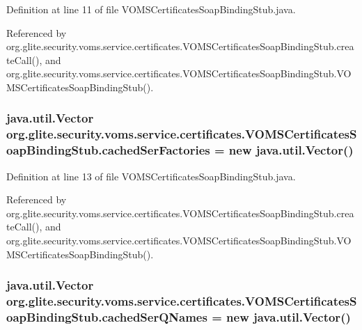 Definition at line 11 of file VOMSCertificatesSoapBindingStub.java.



Referenced by org.glite.security.voms.service.certificates.VOMSCertificatesSoapBindingStub.createCall(), and org.glite.security.voms.service.certificates.VOMSCertificatesSoapBindingStub.VOMSCertificatesSoapBindingStub().

\hypertarget{classorg_1_1glite_1_1security_1_1voms_1_1service_1_1certificates_1_1VOMSCertificatesSoapBindingStub_a66a5fa754279379d65f71345bce521a5}{
\subsubsection[{cachedSerFactories}]{\setlength{\rightskip}{0pt plus 5cm}java.util.Vector {\bf org.glite.security.voms.service.certificates.VOMSCertificatesSoapBindingStub.cachedSerFactories} = new java.util.Vector()}}
\label{classorg_1_1glite_1_1security_1_1voms_1_1service_1_1certificates_1_1VOMSCertificatesSoapBindingStub_a66a5fa754279379d65f71345bce521a5}


Definition at line 13 of file VOMSCertificatesSoapBindingStub.java.



Referenced by org.glite.security.voms.service.certificates.VOMSCertificatesSoapBindingStub.createCall(), and org.glite.security.voms.service.certificates.VOMSCertificatesSoapBindingStub.VOMSCertificatesSoapBindingStub().

\hypertarget{classorg_1_1glite_1_1security_1_1voms_1_1service_1_1certificates_1_1VOMSCertificatesSoapBindingStub_a63bdef3d7a3488e55c1900ac491e79a5}{
\subsubsection[{cachedSerQNames}]{\setlength{\rightskip}{0pt plus 5cm}java.util.Vector {\bf org.glite.security.voms.service.certificates.VOMSCertificatesSoapBindingStub.cachedSerQNames} = new java.util.Vector()}}
\label{classorg_1_1glite_1_1security_1_1voms_1_1service_1_1certificates_1_1VOMSCertificatesSoapBindingStub_a63bdef3d7a3488e55c1900ac491e79a5}



